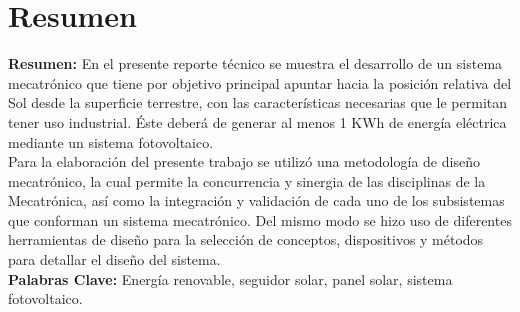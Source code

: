 \chapter{Resumen}


\textbf{Resumen:} En el presente reporte técnico se muestra el desarrollo de un sistema mecatrónico que tiene por objetivo principal apuntar hacia la posición relativa del Sol desde la superficie terrestre, con las características necesarias que le permitan tener uso industrial. Éste deberá de generar al menos 1 KWh de energía eléctrica mediante un sistema fotovoltaico.\\

Para la elaboración del presente trabajo se utilizó una metodología de diseño mecatrónico, la cual permite la concurrencia y sinergia de las disciplinas de la Mecatrónica, así como la integración y validación de cada uno de los subsistemas que conforman un sistema mecatrónico. Del mismo modo se hizo uso de diferentes herramientas de diseño para la selección de conceptos, dispositivos y métodos para detallar el diseño del sistema.\\


\textbf{Palabras Clave:} Energía renovable, seguidor solar, panel solar, sistema fotovoltaico. \\



\endinput 